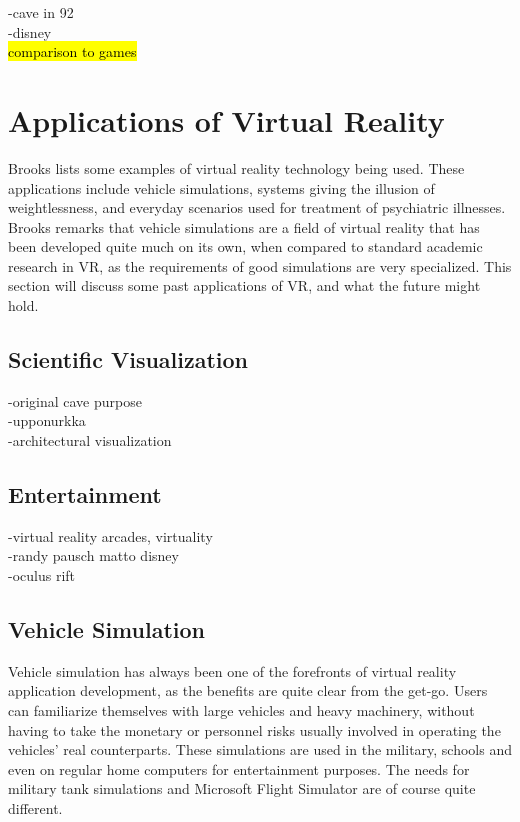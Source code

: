 \documentclass[12pt,a4paper,oneside,pdftex]{report}
\begin{document}
-cave in 92 \\
-disney  \\
 \hl{comparison to games}


\section{Applications of Virtual Reality}
\label{section:applicationsofvr}

Brooks \cite{brooks1999whatsreal} lists some examples of virtual reality technology being used. These applications include vehicle simulations, systems giving the illusion of weightlessness, and everyday scenarios used for treatment of psychiatric illnesses. Brooks remarks that vehicle simulations are a field of virtual reality that has been developed quite much on its own, when compared to standard academic research in VR, as the requirements of good simulations are very specialized. This section will discuss some past applications of VR, and what the future might hold.

\subsection{Scientific Visualization}
\label{subsection:applications:visualization}

-original cave purpose \\
-upponurkka \\
-architectural visualization

\subsection{Entertainment}
\label{subsection:applications:entertainment}

-virtual reality arcades, virtuality \\
-randy pausch matto disney \cite{PauschDisney} \\
-oculus rift

\subsection{Vehicle Simulation}
\label{subsection:applications:vehiclesimulations}

Vehicle simulation has always been one of the forefronts of virtual reality application development, as the benefits are quite clear from the get-go. Users can familiarize themselves with large vehicles and heavy machinery, without having to take the monetary or personnel risks usually involved in operating the vehicles' real counterparts. These simulations are used in the military, schools and even on regular home computers for entertainment purposes. The needs for military tank simulations and Microsoft Flight Simulator are of course quite different.
\end{document}
